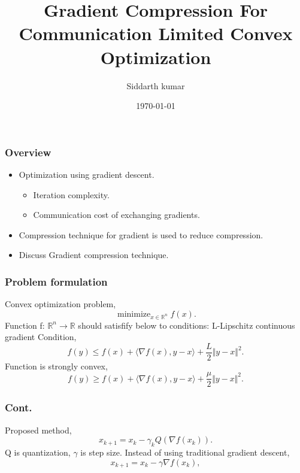 \documentclass{beamer}
\title[Short title]{Gradient Compression For Communication Limited Convex Optimization } %
\author{Siddarth kumar} %
\institute[IITH] %
{
IIT Hyderabad \\ %
\medskip
\text{EE15BTECH11032} %
}
\date{\today} %
\begin{document}
\begin{frame}
\titlepage %
\end{frame}
\begin{frame}
\frametitle{Overview} 
\begin{itemize}
\item Optimization using gradient descent.
	\begin{itemize}
	\item Iteration complexity. %
	\item Communication cost of exchanging gradients.
	\end{itemize}
\item Compression technique for gradient is used to reduce compression.
\item Discuss Gradient compression technique.
\end{itemize}
\end{frame}

\begin{frame}
\frametitle{Problem formulation}
Convex optimization problem, \bigbreak
\begin{equation*} \mathop{\mathrm{minimize}}_{x\in \mathbb{R}^{n}}    f(x).\tag{1} 
\end{equation*}
Function f: $\mathbb{R}^{n} \to \mathbb{R}$ should satisfify below to conditions:\bigbreak
L-Lipschitz continuous gradient Condition,
\begin{equation*} f(y)\leq f(x)+\langle \nabla f(x), y-x\rangle+\frac{L}{2}\Vert y-x\Vert^{2}. \tag{2} 
\end{equation*}
Function is strongly convex,
\begin{equation*} f(y)\geq f(x)+\langle\nabla f(x), y-x\rangle+\frac{\mu}{2}\Vert y-x\Vert^{2}. \tag{3} 
\end{equation*} 
\end{frame}

\begin{frame}
\frametitle{Cont.}
Proposed method, \bigbreak
\begin{equation*} x_{k+1}=x_{k}-\gamma_{k}Q(\nabla f(x_{k})). \end{equation*}
Q is quantization, $\gamma$ is step size.\bigbreak
Instead of using traditional gradient descent, \bigbreak
\begin{equation*} x_{k+1}=x_{k}-\gamma\nabla f(x_{k}), \tag{4} \end{equation*}
\end{frame}
\end{document}
